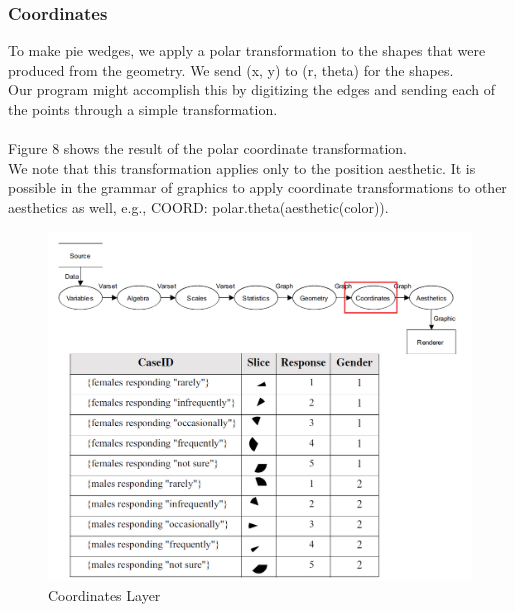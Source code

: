\documentclass[12pt]{article}
\begin{document}
\subsubsection{Coordinates}
To make pie wedges, we apply a polar transformation to the shapes that were
produced from the geometry. We send (x, y) to (r, theta) for the shapes.\\ Our
program might accomplish this by digitizing the edges and sending each of the
points through a simple transformation.\\ \\
Figure 8 shows the result of the polar coordinate transformation.\\
 We note
that this transformation applies only to the position aesthetic. It is possible in
the grammar of graphics to apply coordinate transformations to other aesthetics
as well, e.g., COORD: polar.theta(aesthetic(color)).
\begin{figure}[h!]
\caption{Coordinates Layer}
\includegraphics[width=\textwidth]{pic/pre6}
\end{figure}
\newpage
\end{document}
